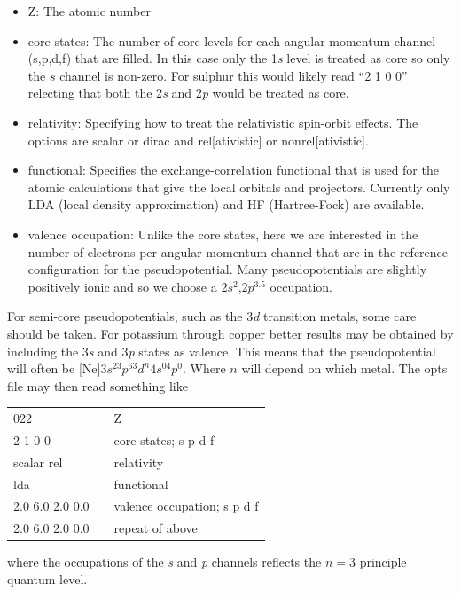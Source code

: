 \documentclass[11pt]{report}
\begin{document}
\begin{itemize}
\item Z: The atomic number
\item core states: The number of core levels for each angular momentum channel (s,p,d,f) that are filled. In this case only the 1{\it s} level is treated as core so only the $s$ channel is non-zero. For sulphur this would likely read ``2 1 0 0'' relecting that both the 2{\it s} and 2{\it p} would be treated as core.
\item relativity: Specifying how to treat the relativistic spin-orbit effects. The options are scalar or dirac and rel[ativistic] or nonrel[ativistic].
\item functional: Specifies the exchange-correlation functional that is used for the atomic calculations that give the local orbitals and projectors. Currently only LDA (local density approximation) and HF (Hartree-Fock) are available.
\item valence occupation: Unlike the core states, here we are interested in the number of electrons per angular momentum channel that are in the reference configuration for the pseudopotential. Many pseudopotentials are slightly positively ionic and so we choose a 2$s^2$,2$p^{3.5}$ occupation. 
\end{itemize}


For semi-core pseudopotentials, such as the 3{\it d} transition metals, some care should be taken. 
For potassium through copper better results may be obtained by including the 3{\it s} and 3{\it p} states as valence. 
This means that the pseudopotential will often be [Ne]$3s^23p^63d^n4s^04p^0$. 
Where $n$ will depend on which metal. 
The opts file may then read something like 
\begin{center}
\begin{tabular}{| l | c l |}
\hline
022				& &  Z\\
2 1 0 0			& & core states; s p d f \\
scalar rel			& & relativity \\
lda				& & functional \\
2.0 6.0 2.0 0.0		& & valence occupation; s p d f \\
2.0 6.0 2.0 0.0		& & repeat of above \\
\hline
\end{tabular}
\end{center}
where the occupations of the {\it s} and {\it p} channels reflects the $n=3$ principle quantum level.


\end{document}
